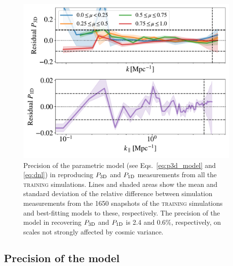 \documentclass{aa}
\newcommand{\poned}{\ensuremath{P_{\rm 1D}}\xspace}
\newcommand{\pthreed}{\ensuremath{P_{\rm 3D}}\xspace}
\newcommand{\lacehc}{\textsc{training}\xspace}
\begin{document}
\begin{figure}
\includegraphics[width=\columnwidth]{figures/goodness_fit_all.pdf}
\centering
\caption{Precision of the parametric model (see Eqs.~\ref{eq:p3d_model} and \ref{eq:dnl}) in reproducing \pthreed and \poned measurements from all the \lacehc simulations. Lines and shaded areas show the mean and standard deviation of the relative difference between simulation measurements from the 1650 snapshots of the \lacehc simulations and best-fitting models to these, respectively. The precision of the model in recovering \pthreed and \poned is 2.4 and 0.6\%, respectively, on scales not strongly affected by cosmic variance.}
\label{fig:goodness}
\end{figure}

\subsection{Precision of the model}
\label{sec:input_precision}
\end{document}
